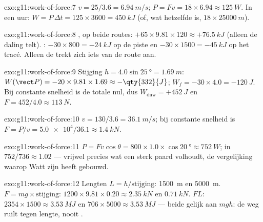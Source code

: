 \begin{solution}{exo:g11:work-of-force:7}
$v = 25/3.6 = \qty{6.94}{m/s}$; $P = Fv = 18 \times 6.94 \approx
\qty{125}{W}$. In een uur: $W = P\,\Delta t = 125 \times 3600 =
\qty{450}{kJ}$ (of, wat hetzelfde is, $18 \times \qty{25000}{m}$).
\end{solution}

\begin{solution}{exo:g11:work-of-force:8}
, op beide routes: $+65 \times 9.81 \times 120 \approx
+\qty{76.5}{kJ}$ (alleen de daling telt). :
$-30 \times 800 = -\qty{24}{kJ}$ op de piste en
$-30 \times 1500 = -\qty{45}{kJ}$ op het tracé. Alleen de  trekt
zich iets van de route aan.
\end{solution}

\begin{solution}{exo:g11:work-of-force:9}
Stijging $h = 4.0\sin\qty{25}{\degree} = \qty{1.69}{m}$:
$W(\vect P) = -20 \times 9.81 \times 1.69 \approx -\qty{332}{J}$;
$W_f = -30 \times 4.0 = -\qty{120}{J}$. Bij constante snelheid is de
totale  nul, dus $W_{\text{duw}} = +\qty{452}{J}$ en
$F = 452/4.0 \approx \qty{113}{N}$.
\end{solution}

\begin{solution}{exo:g11:work-of-force:10}
$v = 130/3.6 = \qty{36.1}{m/s}$; bij constante snelheid is
$F = P/v = \num{5.0e4}/36.1 \approx \qty{1.4}{kN}$.
\end{solution}

\begin{solution}{exo:g11:work-of-force:11}
$P = Fv\cos\theta = 800 \times 1.0 \times \cos\qty{20}{\degree}
\approx \qty{752}{W}$; in  $752/736 \approx \num{1.02}$ ---
vrijwel precies wat een sterk paard volhoudt, de vergelijking waarop
Watt zijn  heeft gebouwd.
\end{solution}

\begin{solution}{exo:g11:work-of-force:12}
Lengten $L = h/\text{stijging}$: \qty{1500}{m} en \qty{5000}{m}.
 $F = mg \times \text{stijging}$:
$1200 \times 9.81 \times 0.20 \approx \qty{2.35}{kN}$ en
$\qty{0.71}{kN}$.  $FL$: $2354 \times 1500 \approx
\qty{3.53}{MJ}$ en $706 \times 5000 \approx \qty{3.53}{MJ}$ --- beide
gelijk aan $mgh$: de weg ruilt  tegen lengte, nooit .
\end{solution}

